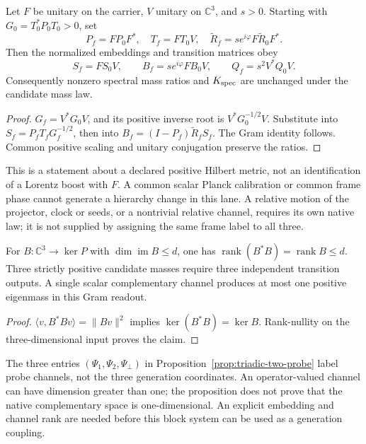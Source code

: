 \begin{proposition}
\label{v480:native-frame-covariance}
Let $F$ be unitary on the carrier, $V$ unitary on $\mathbb C^3$,
and $s>0$. Starting with $G_0=T_0^*P_0T_0>0$, set
\[
 P_f=FP_0F^*,\quad T_f=FT_0V,\quad
 \widetilde R_f=s e^{i\varphi}F\widetilde R_0F^*.
\]
Then the normalized embeddings and transition matrices obey
\[
 S_f=FS_0V,\qquad B_f=s e^{i\varphi}FB_0V,
 \qquad Q_f=s^2V^*Q_0V.
\]
Consequently nonzero spectral mass ratios and $K_{\rm spec}$ are
unchanged under the candidate mass law.
\end{proposition}
\begin{proof}
$G_f=V^*G_0V$, and its positive inverse root is
$V^*G_0^{-1/2}V$. Substitute into $S_f=P_fT_fG_f^{-1/2}$,
then into $B_f=(I-P_f)\widetilde R_fS_f$. The Gram identity follows.
Common positive scaling and unitary conjugation preserve the ratios.
\end{proof}

This is a statement about a declared positive Hilbert metric, not an
identification of a Lorentz boost with $F$. A common scalar Planck
calibration or common frame phase cannot generate a hierarchy change
in this lane. A relative motion of the projector, clock or seeds,
or a nontrivial relative channel, requires its own native law; it is
not supplied by assigning the same frame label to all three.

\begin{proposition}
\label{v480:native-channel-rank}
For $B:\mathbb C^3\to\ker P$ with
$\dim\operatorname{im}B\leq d$, one has
$\operatorname{rank}(B^*B)=\operatorname{rank}B\leq d$.
Three strictly positive candidate masses require three independent
transition outputs. A single scalar complementary channel produces
at most one positive eigenmass in this Gram readout.
\end{proposition}
\begin{proof}
$\langle v,B^*Bv\rangle=\|Bv\|^2$ implies
$\ker(B^*B)=\ker B$. Rank-nullity on the three-dimensional input
proves the claim.
\end{proof}

The three entries $(\Psi_1,\Psi_2,\Psi_\perp)$ in
Proposition~\ref{prop:triadic-two-probe} label probe channels,
not the three generation coordinates. An operator-valued channel
can have dimension greater than one; the proposition does not prove
that the native complementary space is one-dimensional. An explicit
embedding and channel rank are needed before this block system can
be used as a generation coupling.

